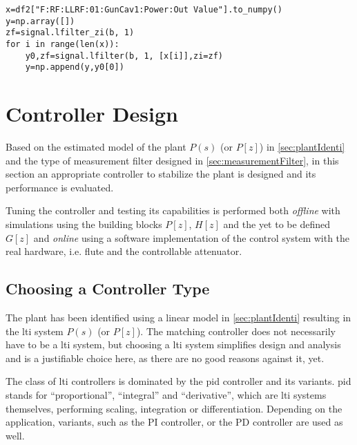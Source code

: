 \begin{lstlisting}[style=python,caption = Demonstration of the \texttt{zi} and \texttt{zf} variables when using \texttt{signal.lfilter()}, label = lst:controllerDesignAndEvaluation-zizf]
x=df2["F:RF:LLRF:01:GunCav1:Power:Out Value"].to_numpy()
y=np.array([])
zf=signal.lfilter_zi(b, 1)
for i in range(len(x)):
    y0,zf=signal.lfilter(b, 1, [x[i]],zi=zf)
    y=np.append(y,y0[0])
\end{lstlisting}











\newpage
\section{Controller Design}
Based on the estimated model of the plant $P(s)$ (or $P[z]$) in \autoref{sec:plantIdenti} and the type of measurement filter designed in \autoref{sec:measurementFilter}, in this section an appropriate controller to stabilize the plant is designed and its performance is evaluated.

Tuning the controller and testing its capabilities is performed both \textit{offline} with simulations using the building blocks $P[z]$, $H[z]$ and the yet to be defined $G[z]$ and \textit{online} using a software implementation of the control system with the real hardware, i.e. \gls{flute} and the controllable attenuator.

\subsection{Choosing a Controller Type}
The plant has been identified using a linear model in \autoref{sec:plantIdenti} resulting in the \gls{lti} system $P(s)$ (or $P[z]$). The matching controller does not necessarily have to be a \gls{lti} system, but choosing a \gls{lti} system simplifies design and analysis and is a justifiable choice here, as there are no good reasons against it, yet.

The class of \gls{lti} controllers is dominated by the \gls{pid} controller and its variants. \gls{pid} stands for ``proportional'', ``integral'' and ``derivative'', which are \gls{lti} systems themselves, performing scaling, integration or differentiation. Depending on the application, variants, such as the PI controller, or the PD controller are used as well.

